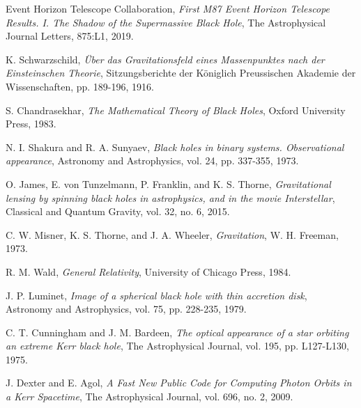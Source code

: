 \documentclass[12pt,a4paper]{article}
\theoremstyle{definition}
\theoremstyle{remark}
\begin{document}
\begin{thebibliography}{99}

Event Horizon Telescope Collaboration,
\textit{First M87 Event Horizon Telescope Results. I. The Shadow of the Supermassive Black Hole},
The Astrophysical Journal Letters, 875:L1, 2019.

K. Schwarzschild,
\textit{Über das Gravitationsfeld eines Massenpunktes nach der Einsteinschen Theorie},
Sitzungsberichte der Königlich Preussischen Akademie der Wissenschaften, pp. 189-196, 1916.

S. Chandrasekhar,
\textit{The Mathematical Theory of Black Holes},
Oxford University Press, 1983.

N. I. Shakura and R. A. Sunyaev,
\textit{Black holes in binary systems. Observational appearance},
Astronomy and Astrophysics, vol. 24, pp. 337-355, 1973.

O. James, E. von Tunzelmann, P. Franklin, and K. S. Thorne,
\textit{Gravitational lensing by spinning black holes in astrophysics, and in the movie Interstellar},
Classical and Quantum Gravity, vol. 32, no. 6, 2015.

C. W. Misner, K. S. Thorne, and J. A. Wheeler,
\textit{Gravitation},
W. H. Freeman, 1973.

R. M. Wald,
\textit{General Relativity},
University of Chicago Press, 1984.

J. P. Luminet,
\textit{Image of a spherical black hole with thin accretion disk},
Astronomy and Astrophysics, vol. 75, pp. 228-235, 1979.

C. T. Cunningham and J. M. Bardeen,
\textit{The optical appearance of a star orbiting an extreme Kerr black hole},
The Astrophysical Journal, vol. 195, pp. L127-L130, 1975.

J. Dexter and E. Agol,
\textit{A Fast New Public Code for Computing Photon Orbits in a Kerr Spacetime},
The Astrophysical Journal, vol. 696, no. 2, 2009.

\end{thebibliography}

\appendix
\end{document}
